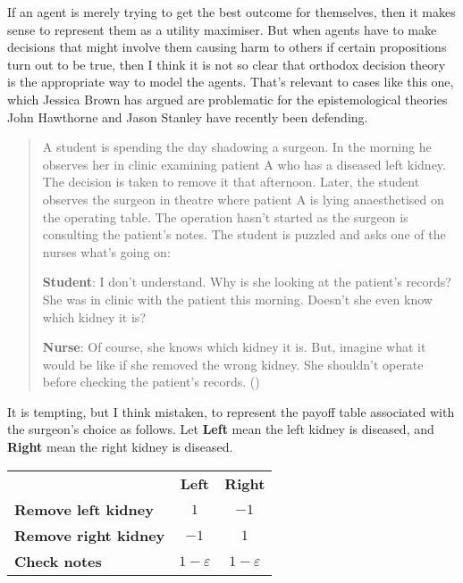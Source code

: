 \documentclass[
  11pt,
  letterpaper,
  DIV=11,
  numbers=noendperiod,
  oneside]{scrartcl}
\begin{document}
If an agent is merely trying to get the best outcome for themselves,
then it makes sense to represent them as a utility maximiser. But when
agents have to make decisions that might involve them causing harm to
others if certain propositions turn out to be true, then I think it is
not so clear that orthodox decision theory is the appropriate way to
model the agents. That's relevant to cases like this one, which Jessica
Brown has argued are problematic for the epistemological theories John
Hawthorne and Jason Stanley have recently been defending.

\begin{quote}
A student is spending the day shadowing a surgeon. In the morning he
observes her in clinic examining patient A who has a diseased left
kidney. The decision is taken to remove it that afternoon. Later, the
student observes the surgeon in theatre where patient A is lying
anaesthetised on the operating table. The operation hasn't started as
the surgeon is consulting the patient's notes. The student is puzzled
and asks one of the nurses what's going on:

\textbf{Student}: I don't understand. Why is she looking at the
patient's records? She was in clinic with the patient this morning.
Doesn't she even know which kidney it is?

\textbf{Nurse}: Of course, she knows which kidney it is. But, imagine
what it would be like if she removed the wrong kidney. She shouldn't
operate before checking the patient's records.
()
\end{quote}

It is tempting, but I think mistaken, to represent the payoff table
associated with the surgeon's choice as follows. Let \textbf{Left} mean
the left kidney is diseased, and \textbf{Right} mean the right kidney is
diseased.

\begin{longtable}[]{@{}lcc@{}}
\toprule\noalign{}
\endhead
\bottomrule\noalign{}
\endlastfoot
& \textbf{Left} & \textbf{Right} \\
\textbf{Remove left kidney} & \(1\) & \(-1\) \\
\textbf{Remove right kidney} & \(-1\) & \(1\) \\
\textbf{Check notes} & \(1-\varepsilon\) & \(1-\varepsilon\) \\
\end{longtable}
\end{document}
